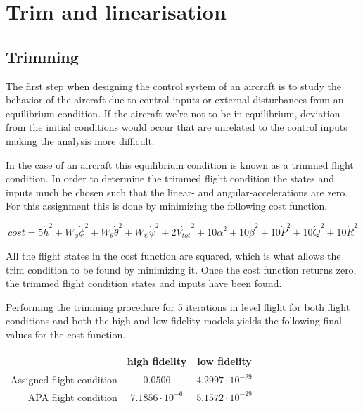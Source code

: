 \section{Trim and linearisation}

\subsection{Trimming}
The first step when designing the control system of an aircraft is to study the behavior of the aircraft due to control inputs or external disturbances from an equilibrium condition. If the aircraft we're not to be in equilibrium, deviation from the initial conditions would occur that are unrelated to the control inputs making the analysis more difficult.

In the case of an aircraft this equilibrium condition is known as a trimmed flight condition. In order to determine the trimmed flight condition the states and inputs much be chosen such that the linear- and angular-accelerations are zero. For this assignment this is done by minimizing the following cost function.

\begin{equation}
    \label{eq:trim_cost}
    cost = 5\dot{h}^2 + 
           W_{\phi}\dot{\phi}^2 +
           W_{\theta}\dot{\theta}^2 + 
           W_{\psi}\dot{\psi}^2 +
           2\dot{V_{tot}}^2 + 
           10\dot{\alpha}^2 + 
           10\dot{\beta}^2 + 
           10\dot{P}^2 +
           10\dot{Q}^2 +
           10\dot{R}^2
\end{equation}

All the flight states in the cost function are squared, which is what allows the trim condition to be found by minimizing it. Once the cost function returns zero, the trimmed flight condition states and inputs have been found.

Performing the trimming procedure for 5 iterations in level flight for both flight conditions and both the high and low fidelity models yields the following final values for the cost function.

\begin{center}
    \begin{tabular}{ r | c | c }
                               & high fidelity & low fidelity \\ \hline \hline
     Assigned flight condition & $0.0506$ & $4.2997\cdot10^{-29}$ \\  
     APA flight condition      & $7.1856\cdot10^{-6}$ & $5.1572\cdot10^{-29}$    
    \end{tabular}
\end{center}

